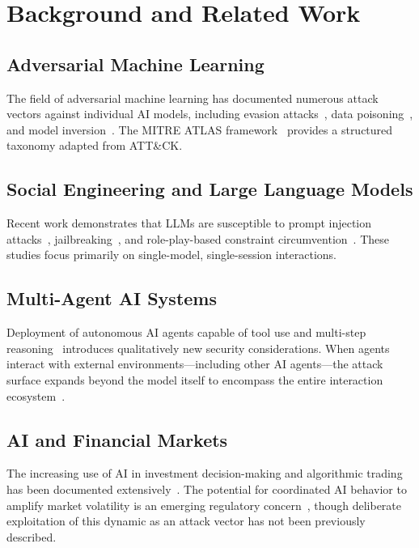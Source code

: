 \documentclass[11pt,a4paper]{article}
\begin{document}
\section{Background and Related Work}

\subsection{Adversarial Machine Learning}

The field of adversarial machine learning has documented numerous attack
vectors against individual AI models, including evasion attacks~\cite{szegedy2013},
data poisoning~\cite{biggio2012}, and model inversion~\cite{fredrikson2015}.
The MITRE ATLAS framework~\cite{mitreatlas} provides a structured taxonomy
adapted from ATT\&CK.

\subsection{Social Engineering and Large Language Models}

Recent work demonstrates that LLMs are susceptible to prompt injection
attacks~\cite{perez2022,greshake2023}, jailbreaking~\cite{wei2023}, and
role-play-based constraint circumvention~\cite{liu2023}. These studies focus
primarily on single-model, single-session interactions.

\subsection{Multi-Agent AI Systems}

Deployment of autonomous AI agents capable of tool use and multi-step
reasoning~\cite{yao2023,park2023} introduces qualitatively new security
considerations. When agents interact with external environments---including
other AI agents---the attack surface expands beyond the model itself to
encompass the entire interaction ecosystem~\cite{yang2024}.

\subsection{AI and Financial Markets}

The increasing use of AI in investment decision-making and algorithmic
trading has been documented extensively~\cite{lopezdeprado2018}. The
potential for coordinated AI behavior to amplify market volatility is an
emerging regulatory concern~\cite{cont2021}, though deliberate exploitation
of this dynamic as an attack vector has not been previously described.
\end{document}
